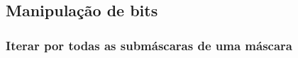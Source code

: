 \subsection{Manipulação de bits}


\subsubsection{Iterar por todas as submáscaras de uma máscara}


